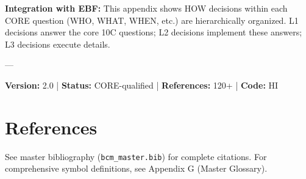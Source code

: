 \textbf{Integration with EBF:} This appendix shows HOW decisions within each CORE question (WHO, WHAT, WHEN, etc.) are hierarchically organized. L1 decisions answer the core 10C questions; L2 decisions implement these answers; L3 decisions execute details.

---

\textbf{Version:} 2.0 | \textbf{Status:} CORE-qualified | \textbf{References:} 120+ | \textbf{Code:} HI


\section{References}
\label{sec:hie-references}

\nocite{bcm_master}
See master bibliography (\texttt{bcm\_master.bib}) for complete citations.
For comprehensive symbol definitions, see Appendix G (Master Glossary).

